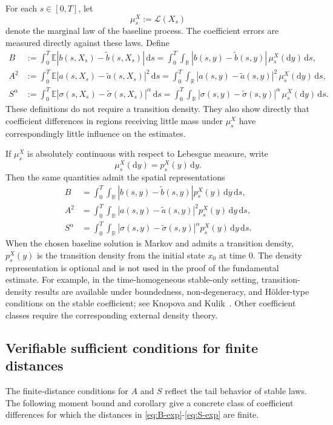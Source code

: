 \documentclass[10pt,a4paper]{amsart}
\newcommand{\R}{\mathbb{R}}
\newcommand{\E}{\mathbb{E}}
\newcommand{\1}{\mathbf{1}}
\newcommand{\dd}{\,\mathrm{d}}
\newcommand{\md}{\mathrm{d}}
\newcommand{\wt}{\tilde}
\begin{document}
For each $s\in[0,T]$, let
\[
  \mu_s^X:=\mathcal L(X_s)
\]
denote the marginal law of the baseline process. The coefficient errors are measured directly against these laws. Define
\begin{align}
B&:=\int_0^T\E |b(s,X_s)-\wt b(s,X_s)|\dd s
  =\int_0^T\int_\R |b(s,y)-\wt b(s,y)|\,\mu_s^X(\md y)\dd s, \label{eq:B-exp}\\
A^2&:=\int_0^T\E |a(s,X_s)-\wt a(s,X_s)|^2\dd s
  =\int_0^T\int_\R |a(s,y)-\wt a(s,y)|^2\,\mu_s^X(\md y)\dd s, \label{eq:A-exp}\\
S^\alpha&:=\int_0^T\E |\sigma(s,X_s)-\wt\sigma(s,X_s)|^\alpha\dd s
  =\int_0^T\int_\R |\sigma(s,y)-\wt\sigma(s,y)|^\alpha\,\mu_s^X(\md y)\dd s. \label{eq:S-exp}
\end{align}
These definitions do not require a transition density. They also show directly that coefficient differences in regions receiving little mass under $\mu_s^X$ have correspondingly little influence on the estimates.

If $\mu_s^X$ is absolutely continuous with respect to Lebesgue measure, write
\[
  \mu_s^X(\md y)=p_s^X(y)\,\md y.
\]
Then the same quantities admit the spatial representations
\begin{align}
B&=\int_0^T\int_\R |b(s,y)-\wt b(s,y)|p_s^X(y)\dd y\dd s, \label{eq:B-density}\\
A^2&=\int_0^T\int_\R |a(s,y)-\wt a(s,y)|^2p_s^X(y)\dd y\dd s, \label{eq:A-density}\\
S^\alpha&=\int_0^T\int_\R |\sigma(s,y)-\wt\sigma(s,y)|^\alpha p_s^X(y)\dd y\dd s. \label{eq:S-density}
\end{align}
When the chosen baseline solution is Markov and admits a transition density, $p_s^X(y)$ is the transition density from the initial state $x_0$ at time $0$. The density representation is optional and is not used in the proof of the fundamental estimate. For example, in the time-homogeneous stable-only setting, transition-density results are available under boundedness, non-degeneracy, and H\"older-type conditions on the stable coefficient; see Knopova and Kulik~\cite{KnopovaKulik2018}. Other coefficient classes require the corresponding external density theory.

\subsection{Verifiable sufficient conditions for finite distances}
\label{subsec:finite-distances}

The finite-distance conditions for $A$ and $S$ reflect the tail behavior of stable laws. The following moment bound and corollary give a concrete class of coefficient differences for which the distances in \eqref{eq:B-exp}-\eqref{eq:S-exp} are finite.
\end{document}
